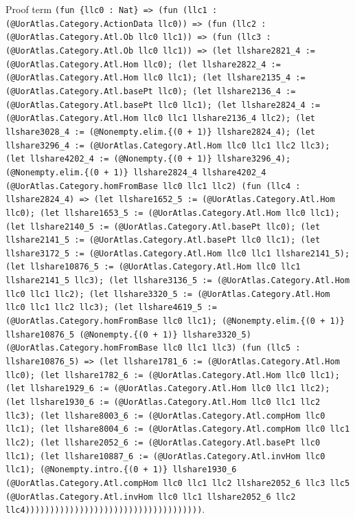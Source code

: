 \documentclass[11pt]{article}
\begin{document}
\noindent Proof term \texttt{(fun \{llc0 : Nat\} => (fun (llc1 : (@UorAtlas.Category.ActionData llc0)) => (fun (llc2 : (@UorAtlas.Category.Atl.Ob llc0 llc1)) => (fun (llc3 : (@UorAtlas.Category.Atl.Ob llc0 llc1)) => (let llshare2821\_4 := (@UorAtlas.Category.Atl.Hom llc0); (let llshare2822\_4 := (@UorAtlas.Category.Atl.Hom llc0 llc1); (let llshare2135\_4 := (@UorAtlas.Category.Atl.basePt llc0); (let llshare2136\_4 := (@UorAtlas.Category.Atl.basePt llc0 llc1); (let llshare2824\_4 := (@UorAtlas.Category.Atl.Hom llc0 llc1 llshare2136\_4 llc2); (let llshare3028\_4 := (@Nonempty.elim.\{(0 + 1)\} llshare2824\_4); (let llshare3296\_4 := (@UorAtlas.Category.Atl.Hom llc0 llc1 llc2 llc3); (let llshare4202\_4 := (@Nonempty.\{(0 + 1)\} llshare3296\_4); (@Nonempty.elim.\{(0 + 1)\} llshare2824\_4 llshare4202\_4 (@UorAtlas.Category.homFromBase llc0 llc1 llc2) (fun (llc4 : llshare2824\_4) => (let llshare1652\_5 := (@UorAtlas.Category.Atl.Hom llc0); (let llshare1653\_5 := (@UorAtlas.Category.Atl.Hom llc0 llc1); (let llshare2140\_5 := (@UorAtlas.Category.Atl.basePt llc0); (let llshare2141\_5 := (@UorAtlas.Category.Atl.basePt llc0 llc1); (let llshare3172\_5 := (@UorAtlas.Category.Atl.Hom llc0 llc1 llshare2141\_5); (let llshare10876\_5 := (@UorAtlas.Category.Atl.Hom llc0 llc1 llshare2141\_5 llc3); (let llshare3136\_5 := (@UorAtlas.Category.Atl.Hom llc0 llc1 llc2); (let llshare3320\_5 := (@UorAtlas.Category.Atl.Hom llc0 llc1 llc2 llc3); (let llshare4619\_5 := (@UorAtlas.Category.homFromBase llc0 llc1); (@Nonempty.elim.\{(0 + 1)\} llshare10876\_5 (@Nonempty.\{(0 + 1)\} llshare3320\_5) (@UorAtlas.Category.homFromBase llc0 llc1 llc3) (fun (llc5 : llshare10876\_5) => (let llshare1781\_6 := (@UorAtlas.Category.Atl.Hom llc0); (let llshare1782\_6 := (@UorAtlas.Category.Atl.Hom llc0 llc1); (let llshare1929\_6 := (@UorAtlas.Category.Atl.Hom llc0 llc1 llc2); (let llshare1930\_6 := (@UorAtlas.Category.Atl.Hom llc0 llc1 llc2 llc3); (let llshare8003\_6 := (@UorAtlas.Category.Atl.compHom llc0 llc1); (let llshare8004\_6 := (@UorAtlas.Category.Atl.compHom llc0 llc1 llc2); (let llshare2052\_6 := (@UorAtlas.Category.Atl.basePt llc0 llc1); (let llshare10887\_6 := (@UorAtlas.Category.Atl.invHom llc0 llc1); (@Nonempty.intro.\{(0 + 1)\} llshare1930\_6 (@UorAtlas.Category.Atl.compHom llc0 llc1 llc2 llshare2052\_6 llc3 llc5 (@UorAtlas.Category.Atl.invHom llc0 llc1 llshare2052\_6 llc2 llc4))))))))))))))))))))))))))))))))))))}.\par
\end{document}

